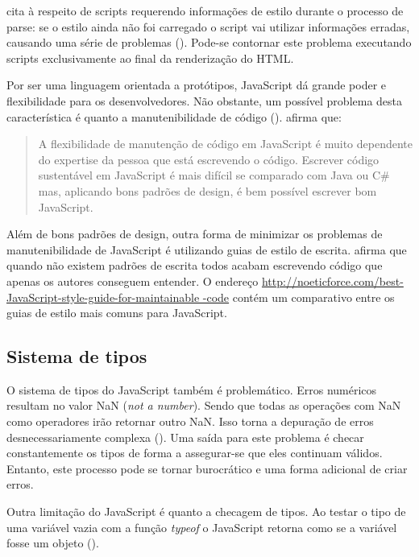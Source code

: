 \citet{howBrowsersWork} cita à respeito de scripts requerendo informações de
estilo durante o processo de parse: \textquotedbl se o estilo ainda não foi carregado
o script vai utilizar informações erradas, causando uma série de
problemas\textquotedbl{} (). Pode-se
contornar este problema executando scripts exclusivamente ao final da
renderização do HTML.

Por ser uma linguagem orientada a protótipos, JavaScript dá grande
poder e flexibilidade para os desenvolvedores. Não obstante, um
possível problema desta característica é quanto a manutenibilidade de
código (). \citet{html5Tradeoffs} afirma que:

\begin{quote}
A flexibilidade de manutenção de código em JavaScript é muito
dependente do expertise da pessoa que está escrevendo o código.
Escrever código \textquotedbl sustentável\textquotedbl{} em JavaScript
é mais difícil se comparado com Java ou C\# mas, aplicando bons
padrões de design, é bem possível escrever bom JavaScript.
\end{quote}

Além de bons padrões de design, outra forma de minimizar
os problemas de manutenibilidade de JavaScript é utilizando
guias de estilo de escrita. \citet{jsStyleGuide} afirma que
quando não existem padrões de escrita todos acabam escrevendo
código que apenas os autores conseguem entender. O endereço
\url{http://noeticforce.com/best-JavaScript-style-guide-for-maintainable
-code} contém um comparativo entre os guias de estilo mais comuns para
JavaScript.

\subsection{Sistema de tipos}

O sistema de tipos do JavaScript também é problemático. Erros
numéricos resultam no valor NaN (\textit{not a number}). Sendo que
todas as operações com NaN como operadores irão retornar outro
NaN. Isso torna a depuração de erros desnecessariamente complexa
\textsc{\autocite{html5mostwanted} (}). Uma saída
para este problema é checar constantemente os tipos de forma a
assegurar-se que eles continuam válidos. Entanto, este processo
pode se tornar burocrático e uma forma adicional de criar erros.

Outra limitação do JavaScript é quanto a checagem de tipos. Ao
testar o tipo de uma variável vazia com a função \textit{typeof}
o JavaScript retorna como se a variável fosse um objeto
().

